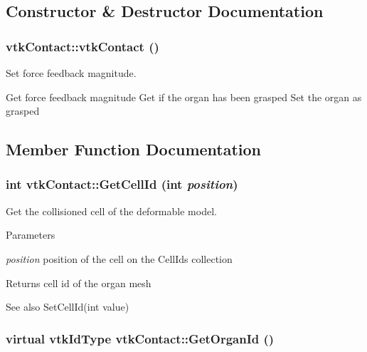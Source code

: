 \subsection{Constructor \& Destructor Documentation}
\hypertarget{classvtkContact_a1cceca85a524ff06fd3a985e680a91f1}{
\subsubsection[{vtkContact}]{\setlength{\rightskip}{0pt plus 5cm}vtkContact::vtkContact ()}}
\label{classvtkContact_a1cceca85a524ff06fd3a985e680a91f1}


Set force feedback magnitude. 

Get force feedback magnitude Get if the organ has been grasped Set the organ as grasped 

\subsection{Member Function Documentation}
\hypertarget{classvtkContact_a825566e780e4fca5dc766b3c7c259366}{
\subsubsection[{GetCellId}]{\setlength{\rightskip}{0pt plus 5cm}int vtkContact::GetCellId (int {\em position})}}
\label{classvtkContact_a825566e780e4fca5dc766b3c7c259366}


Get the collisioned cell of the deformable model. 


\begin{DoxyParams}{Parameters}
\item[{\em position}]position of the cell on the CellIds collection \end{DoxyParams}
\begin{DoxyReturn}{Returns}
cell id of the organ mesh 
\end{DoxyReturn}
\begin{DoxySeeAlso}{See also}
SetCellId(int value) 
\end{DoxySeeAlso}
\hypertarget{classvtkContact_a28dba7ad9b5ffb3bbefc4ec035ed738c}{
\subsubsection[{GetOrganId}]{\setlength{\rightskip}{0pt plus 5cm}virtual vtkIdType vtkContact::GetOrganId ()}}
\label{classvtkContact_a28dba7ad9b5ffb3bbefc4ec035ed738c}


